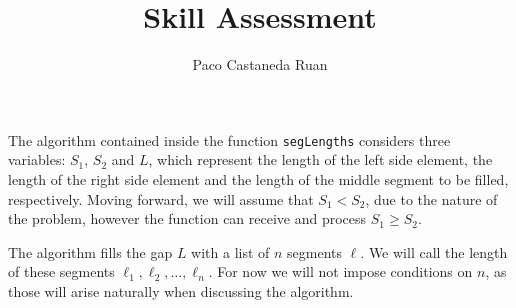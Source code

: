\documentclass[12pt]{article}
\newcommand{\So}{S_1}
\newcommand{\St}{S_2}
\begin{document}
\title{Skill Assessment}

\author{Paco Castaneda Ruan}

\maketitle

The algorithm contained inside the function \verb|segLengths| considers three variables: $\So$, $\St$ and $L$, which represent the length of the left side element, the length of the right side element and the length of the middle segment to be filled, respectively. Moving forward, we will assume that $\So < \St$, due to the nature of the problem, however the function can receive and process $\So \geq \St$.

The algorithm fills the gap $L$ with a list of $n$ segments $\ell$. We will call the length of these segments $\ell_1, \ell_2, \dots, \ell_n$. For now we will not impose conditions on $n$, as those will arise naturally when discussing the algorithm. 
\end{document}

